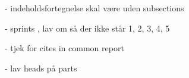 - indeholdsfortegnelse skal være uden subsections

- sprints , lav om så der ikke står 1, 2, 3, 4, 5

- tjek for cites in common report

- lav heads på parts

